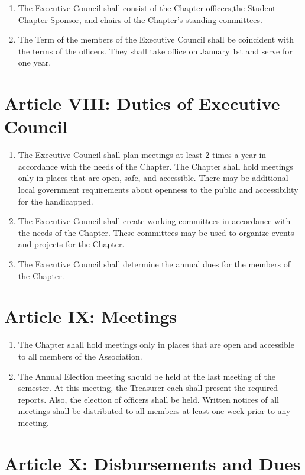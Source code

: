 \begin{enumerate}
	\item The Executive Council shall consist of the Chapter officers,the Student Chapter Sponsor, and chairs of the Chapter's standing committees.
	\item The Term of the members of the Executive Council shall be coincident with the terms of the officers. They shall take office on January 1st and serve for one year.
\end{enumerate}

 
\section*{Article VIII: Duties of Executive Council}

\begin{enumerate}
	\item The Executive Council shall plan meetings at least 2 times a year in accordance with the needs of the Chapter. The Chapter shall hold meetings only in places that are open, safe, and accessible. There may be additional local government requirements about openness to the public and accessibility for the handicapped.
	\item The Executive Council shall create working committees in accordance with the needs of the Chapter. These committees may be used to organize events and projects for the Chapter.
	\item The Executive Council shall determine the annual dues for the members of the Chapter.
\end{enumerate}

\section*{Article IX: Meetings}
 
\begin{enumerate}
	\item The Chapter shall hold meetings only in places that are open and accessible to all members of the Association.
	\item The Annual Election meeting should be held at the last meeting of the semester. At this meeting, the Treasurer each shall present the required reports. Also, the election of officers shall be held. Written notices of all meetings shall be distributed to all members at least one week prior to any meeting.
\end{enumerate}

\section*{Article X: Disbursements and Dues}
 
